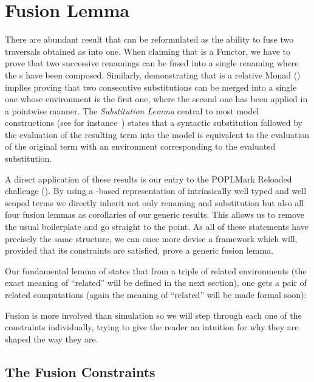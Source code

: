 \section{Fusion Lemma}\label{section:fusion}

There are abundant result that can be reformulated as the ability to fuse
two traversals obtained as  into one.
%
When claiming that  is
a Functor, we have to prove that two successive renamings can be fused into
a single renaming where the s have been composed.
%
Similarly,
demonstrating that  is a relative Monad (\cite{JFR4389}) implies proving
that two consecutive substitutions can be merged into a single one whose
environment is the first one, where the second one has been applied in a
pointwise manner.
%
The \emph{Substitution Lemma} central
to most model constructions (see for instance~\cite{mitchell1991kripke}) states
that a syntactic substitution followed by the evaluation of the resulting term
into the model is equivalent to the evaluation of the original term with an
environment corresponding to the evaluated substitution.

A direct application of these results is our entry to the
POPLMark Reloaded challenge (\citeyear{poplmarkreloaded}). By using a
-based representation of intrinsically well typed and well scoped
terms we directly inherit not only renaming and substitution but also all
four fusion lemmas as corollaries
of our generic results. This allows us to remove the usual boilerplate
and go straight to the point.
As all of these statements have precisely the same structure, we can
once more devise a framework which will, provided that its constraints are
satisfied, prove a generic fusion lemma.


Our fundamental lemma of  states that from a triple of related
environments (the exact meaning of ``related'' will be defined in the next
section), one gets a pair of related computations (again the meaning of
``related'' will be made formal soon):

\begin{agdasnippet}
\end{agdasnippet}

Fusion is more involved than simulation so we will step through each one of
the constraints individually, trying to give the reader an intuition
for why they are shaped the way they are.


\subsection{The Fusion Constraints}

